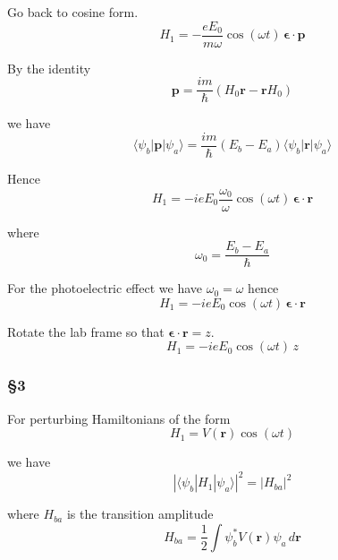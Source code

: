 Go back to cosine form.
\begin{equation*}
H_1=-\frac{eE_0}{m\omega}\cos(\omega t)\,\boldsymbol{\epsilon}\cdot\mathbf p
\end{equation*}

By the identity
\begin{equation*}
\mathbf p=\frac{im}{\hbar}(H_0\mathbf r-\mathbf rH_0)
\end{equation*}

we have
\begin{equation*}
\langle\psi_b|\mathbf p|\psi_a\rangle
=\frac{im}{\hbar}(E_b-E_a)\langle\psi_b|\mathbf r|\psi_a\rangle
\end{equation*}

Hence
\begin{equation*}
H_1=-ieE_0\frac{\omega_0}{\omega}\cos(\omega t)\,\boldsymbol\epsilon\cdot\mathbf r
\end{equation*}

where
\begin{equation*}
\omega_0=\frac{E_b-E_a}{\hbar}
\end{equation*}

For the photoelectric effect we have $\omega_0=\omega$ hence
\begin{equation*}
H_1=-ieE_0\cos(\omega t)\,\boldsymbol\epsilon\cdot\mathbf r
\end{equation*}

Rotate the lab frame so that $\boldsymbol\epsilon\cdot\mathbf r=z$.
\begin{equation*}
H_1=-ieE_0\cos(\omega t)\,z
\end{equation*}

\subsubsection*{\S3}

For perturbing Hamiltonians of the form
\begin{equation*}
H_1=V(\mathbf r)\cos(\omega t)
\end{equation*}

we have
\begin{equation*}
|\langle\psi_b|H_1|\psi_a\rangle|^2=|H_{ba}|^2
\end{equation*}

where $H_{ba}$ is the transition amplitude
\begin{equation*}
H_{ba}=\frac{1}{2}\int\psi_b^*V(\mathbf r)\psi_a\,d\mathbf r
\end{equation*}

